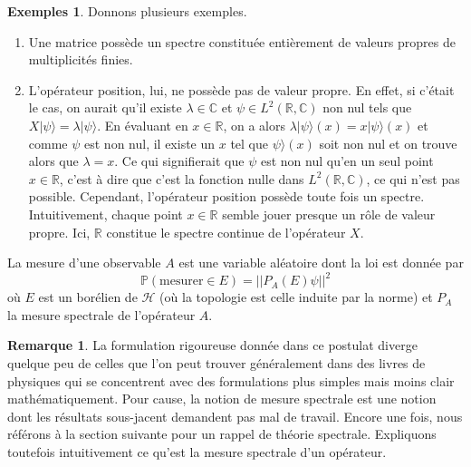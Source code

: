 \documentclass[12pt,openany,a4paper, titlepage]{article}
\newcommand{\R}{\mathbb{R}}
\newcommand{\C}{\mathbb{C}}
\newcommand{\HH}{\mathcal{H}}
\theoremstyle{definition}
\theoremstyle{definition}
\theoremstyle{definition}
\theoremstyle{definition}
\newtheorem{exs}{Exemples}
\theoremstyle{definition}
\newtheorem{rem}{Remarque}
\theoremstyle{definition}
\begin{document}
\begin{exs}
    Donnons plusieurs exemples.
    \begin{enumerate}
        \item[1] Une matrice possède un spectre constituée entièrement de valeurs propres de multiplicités finies.
        \item[2] L'opérateur position, lui, ne possède pas de valeur propre. En effet, si c'était le cas, on aurait qu'il existe $\lambda\in\C$ et $\psi\in L^2(\R,\C)$ non nul  tels que $X|\psi\rangle = \lambda |\psi\rangle$. En évaluant en $x\in\R$, on a alors $\lambda |\psi\rangle(x) = x|\psi\rangle(x)$ et comme $\psi$ est non nul, il existe un $x$ tel que $\psi\rangle(x)$ soit non nul et on trouve alors que $\lambda = x$. Ce qui signifierait que $\psi$ est non nul qu'en un seul point $x\in\R$, c'est à dire que c'est la fonction nulle dans $L^2(\R,\C)$, ce qui n'est pas possible. Cependant, l'opérateur position possède toute fois un spectre. Intuitivement, chaque point $x\in\R$ semble jouer presque un rôle de valeur propre. Ici, $\R$ constitue le spectre continue de l'opérateur $X$.
    \end{enumerate}
\end{exs}

\vspace{3mm}
\begin{tcolorbox}[colback=gray!5!white,
                  colframe=gray!80!white,
                  title= Postulat 4 : Principe de décomposition spectrale ]
La mesure d'une observable $A$ est une variable aléatoire dont la loi est donnée par $$\mathbb{P}(\text{mesurer} \in E) = ||P_A(E)\psi||^2$$
où $E$ est un borélien de $\HH$ (où la topologie est celle induite par la norme) et $P_A$ la mesure spectrale de l'opérateur $A$.  
\end{tcolorbox}
\vspace{3mm}

\begin{rem}
    La formulation rigoureuse donnée dans ce postulat diverge quelque peu de celles que l'on peut trouver généralement dans des livres de physiques qui se concentrent avec des formulations plus simples mais moins clair mathématiquement. Pour cause, la notion de mesure spectrale est une notion dont les résultats sous-jacent demandent pas mal de travail. Encore une fois, nous référons à la section suivante pour un rappel de théorie spectrale. Expliquons toutefois intuitivement ce qu'est la mesure spectrale d'un opérateur.
\end{rem}
\end{document}
